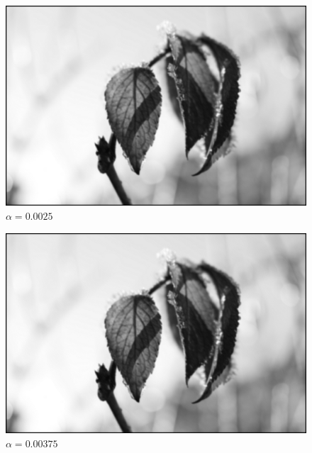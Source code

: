 \documentclass{article}
\theoremstyle{case}
\begin{document}
\begin{figure}
  \includegraphics[width=\linewidth]{../output/neu2_output_18k_alpha00025.png}
  \caption{$\alpha=0.0025$}
  \label{fig:bilda7}
\end{figure}

\begin{figure}
  \includegraphics[width=\linewidth]{../output/neu2_output_18k_alpha000375.png}
  \caption{$\alpha=0.00375$}
  \label{fig:bilda8}
\end{figure}

%
%
\end{document}

